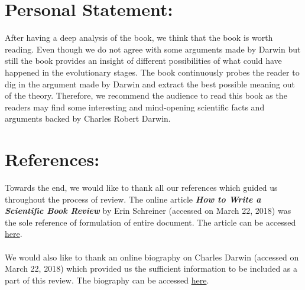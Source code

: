 \documentclass{article}
\begin{document}
\section*{Personal Statement:}
	After having a deep analysis of the book, we think that the book is worth reading. Even though we do not agree with some arguments made by Darwin but still the book provides an insight of different possibilities of what could have happened in the evolutionary stages. The book continuously probes the reader to dig in the argument made by Darwin and extract the best possible meaning out of the theory. Therefore, we recommend the audience to read this book as the readers may find some interesting and mind-opening scientific facts and arguments backed by Charles Robert Darwin. 
\pagebreak

\section*{References:}
	Towards the end, we would like to thank all our references which guided us throughout the process of review. The online article \textbf{\textit{How to Write a Scientific Book Review}} by Erin Schreiner (accessed on March 22, 2018) was the sole reference of formulation of entire document. The article can be accessed \href{http://penandthepad.com/write-scientific-book-review-7762473.html}{here}. \\ \\
	We would also like to thank an online biography on Charles Darwin (accessed on March 22, 2018) which provided us the sufficient information to be included as a part of this review. The biography can be accessed \href{https://www.biography.com/people/charles-darwin-9266433}{here}. 

%
\end{document}
